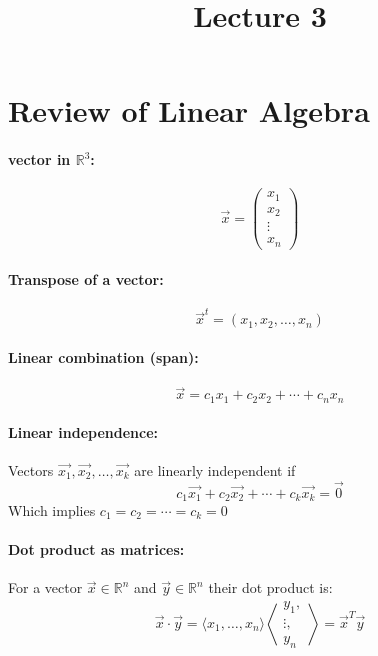 \documentclass{article}
\title{Lecture 3}
\begin{document}
\maketitle

\section{Review of Linear Algebra}

\paragraph{vector in $\mathbb{R}^3$:}
$$
\vec{x} = \begin{pmatrix}
            x_1 \\
            x_2 \\
            \vdots \\
            x_n
\end{pmatrix}
$$

\paragraph{Transpose of a vector:}
$$
\vec{x}^t = (x_1, x_2, \ldots, x_n)
$$

\paragraph{Linear combination (span):}
$$
\vec{x} = c_1 x_1 + c_2 x_2 + \cdots + c_n x_n
$$

\paragraph{Linear independence:}
Vectors $\vec{x_1}, \vec{x_2}, \ldots, \vec{x_k}$ are linearly independent if
$$
c_1 \vec{x_1} + c_2 \vec{x_2} + \cdots + c_k \vec{x_k} = \vec{0}
$$
Which implies $c_1 = c_2 = \cdots = c_k = 0$

\paragraph{Dot product as matrices:}
For a vector $\vec{x} \in \mathbb{R}^n$ and $\vec{y} \in \mathbb{R}^n$ their dot product is:
$$
\vec{x} \cdot \vec{y} = \langle x_1, \ldots, x_n \rangle \left \langle \begin{matrix}
    y_1, \\
    \vdots, \\
    y_n
\end{matrix} \right \rangle = \vec{x}^T \vec{y}
$$
\end{document}
